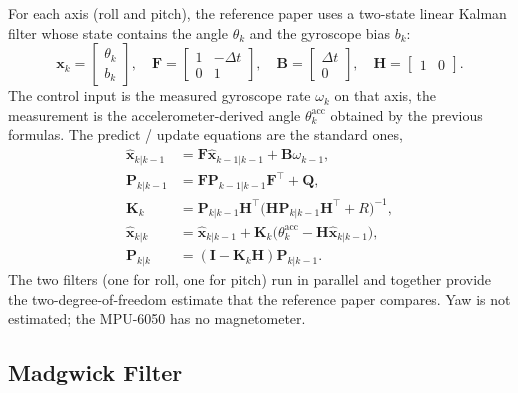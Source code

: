 \documentclass[conference]{IEEEtran}
\newcommand{\bm}[1]{\mathbf{#1}}
\begin{document}
For each axis (roll and pitch), the reference paper uses a
two-state linear Kalman filter whose state contains the angle
$\theta_k$ and the gyroscope bias $b_k$:
\begin{equation}
\bm{x}_k =
\begin{bmatrix}\theta_k\\ b_k\end{bmatrix},\quad
\bm{F} =
\begin{bmatrix}1 & -\Delta t \\ 0 & 1\end{bmatrix},\quad
\bm{B} =
\begin{bmatrix}\Delta t \\ 0\end{bmatrix},\quad
\bm{H} = \begin{bmatrix}1 & 0\end{bmatrix}.
\end{equation}
The control input is the measured gyroscope rate $\omega_k$ on
that axis, the measurement is the accelerometer-derived angle
$\theta_k^{\mathrm{acc}}$ obtained by the previous formulas. The
predict / update equations are the standard ones,
\begin{align}
\hat{\bm{x}}_{k|k-1} &= \bm{F}\hat{\bm{x}}_{k-1|k-1} + \bm{B}\omega_{k-1},\\
\bm{P}_{k|k-1} &= \bm{F}\bm{P}_{k-1|k-1}\bm{F}^\top + \bm{Q},\\
\bm{K}_k &= \bm{P}_{k|k-1}\bm{H}^\top
\bigl(\bm{H}\bm{P}_{k|k-1}\bm{H}^\top + R\bigr)^{-1},\\
\hat{\bm{x}}_{k|k} &= \hat{\bm{x}}_{k|k-1}
+ \bm{K}_k\bigl(\theta_k^{\mathrm{acc}} - \bm{H}\hat{\bm{x}}_{k|k-1}\bigr),\\
\bm{P}_{k|k} &= (\bm{I} - \bm{K}_k\bm{H})\bm{P}_{k|k-1}.
\end{align}
The two filters (one for roll, one for pitch) run in parallel and
together provide the two-degree-of-freedom estimate that the
reference paper compares. Yaw is not estimated; the MPU-6050 has
no magnetometer.

\subsection{Madgwick Filter}
\end{document}
